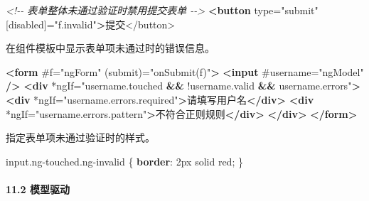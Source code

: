 \documentclass[
]{article}
\newenvironment{Shaded}{}{}
\newcommand{\CommentTok}[1]{\textcolor[rgb]{0.38,0.63,0.69}{\textit{#1}}}
\newcommand{\ConstantTok}[1]{\textcolor[rgb]{0.53,0.00,0.00}{#1}}
\newcommand{\DataTypeTok}[1]{\textcolor[rgb]{0.56,0.13,0.00}{#1}}
\newcommand{\DecValTok}[1]{\textcolor[rgb]{0.25,0.63,0.44}{#1}}
\newcommand{\ErrorTok}[1]{\textcolor[rgb]{1.00,0.00,0.00}{\textbf{#1}}}
\newcommand{\FunctionTok}[1]{\textcolor[rgb]{0.02,0.16,0.49}{#1}}
\newcommand{\KeywordTok}[1]{\textcolor[rgb]{0.00,0.44,0.13}{\textbf{#1}}}
\newcommand{\NormalTok}[1]{#1}
\newcommand{\OperatorTok}[1]{\textcolor[rgb]{0.40,0.40,0.40}{#1}}
\newcommand{\OtherTok}[1]{\textcolor[rgb]{0.00,0.44,0.13}{#1}}
\newcommand{\StringTok}[1]{\textcolor[rgb]{0.25,0.44,0.63}{#1}}
\begin{document}
\begin{Shaded}
\begin{Highlighting}[]
\CommentTok{\textless{}!{-}{-} 表单整体未通过验证时禁用提交表单 {-}{-}\textgreater{}}
\KeywordTok{\textless{}button}\OtherTok{ type=}\StringTok{"submit"}\OtherTok{ [disabled]=}\StringTok{"f.invalid"}\KeywordTok{\textgreater{}}\NormalTok{提交\textless{}/button\textgreater{}}
\end{Highlighting}
\end{Shaded}

在组件模板中显示表单项未通过时的错误信息。

\begin{Shaded}
\begin{Highlighting}[]
\KeywordTok{\textless{}form}\OtherTok{ \#f=}\StringTok{"ngForm"}\OtherTok{ (submit)=}\StringTok{"onSubmit(f)"}\KeywordTok{\textgreater{}}
  \KeywordTok{\textless{}input}\OtherTok{ \#username=}\StringTok{"ngModel"} \KeywordTok{/\textgreater{}}
  \KeywordTok{\textless{}div}\OtherTok{ *ngIf=}\StringTok{"username.touched }\ErrorTok{\&\&}\StringTok{ !username.valid }\ErrorTok{\&\&}\StringTok{ username.errors"}\KeywordTok{\textgreater{}}
    \KeywordTok{\textless{}div}\OtherTok{ *ngIf=}\StringTok{"username.errors.required"}\KeywordTok{\textgreater{}}\NormalTok{请填写用户名}\KeywordTok{\textless{}/div\textgreater{}}
    \KeywordTok{\textless{}div}\OtherTok{ *ngIf=}\StringTok{"username.errors.pattern"}\KeywordTok{\textgreater{}}\NormalTok{不符合正则规则}\KeywordTok{\textless{}/div\textgreater{}}
  \KeywordTok{\textless{}/div\textgreater{}}
\KeywordTok{\textless{}/form\textgreater{}}
\end{Highlighting}
\end{Shaded}

指定表单项未通过验证时的样式。

\begin{Shaded}
\begin{Highlighting}[]
\NormalTok{input}\FunctionTok{.ng{-}touched.ng{-}invalid}\NormalTok{ \{}
  \KeywordTok{border}\NormalTok{: }\DecValTok{2}\DataTypeTok{px} \DecValTok{solid} \ConstantTok{red}\OperatorTok{;}
\NormalTok{\}}
\end{Highlighting}
\end{Shaded}

\hypertarget{112-ux6a21ux578bux9a71ux52a8}{%
\paragraph{11.2 模型驱动}\label{112-ux6a21ux578bux9a71ux52a8}}
\end{document}
